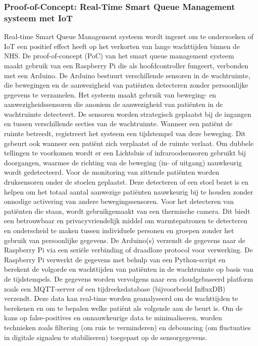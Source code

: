 \subsubsection*{Proof-of-Concept: Real-Time Smart Queue Management systeem met IoT}
Real-time Smart Queue Management systeem wordt ingezet om te onderzoeken of IoT een positief effect heeft op het verkorten van lange wachttijden binnen de NHS. De proof-of-concept (PoC) van het smart queue management systeem maakt gebruik van een Raspberry Pi die als hoofdcontroller fungeert, verbonden met een Arduino. De Arduino bestuurt verschillende sensoren in de wachtruimte, die bewegingen en de aanwezigheid van patiënten detecteren zonder persoonlijke gegevens te verzamelen. Het systeem maakt gebruik van beweging- en aanwezigheidssensoren die anoniem de aanwezigheid van patiënten in de wachtruimte detecteert. De sensoren worden strategisch geplaatst bij de ingangen en tussen verschillende secties van de wachtruimte. Wanneer een patiënt de ruimte betreedt, registreert het systeem een tijdstempel van deze beweging. Dit gebeurt ook wanneer een patiënt zich verplaatst of de ruimte verlaat. Om dubbele tellingen te voorkomen wordt er een Lichtsluis of infraroodsensoren gebruikt bij doorgangen, waarmee de richting van de beweging (in- of uitgang) nauwkeurig wordt gedetecteerd. Voor de monitoring van zittende patiënten worden druksensoren onder de stoelen geplaatst. Deze detecteren of een stoel bezet is en helpen om het totaal aantal aanwezige patiënten nauwkeurig bij te houden zonder onnodige activering van andere bewegingssensoren. Voor het detecteren van patiënten die staan, wordt gebruikgemaakt van een thermische camera. Dit biedt een betrouwbaar en privacyvriendelijk middel om warmtepatronen te detecteren en onderscheid te maken tussen individuele personen en groepen zonder het gebruik van persoonlijke gegevens. De Arduino(s) verzendt de gegevens naar de Raspberry Pi via een seriële verbinding of draadloze protocol voor verwerking. De Raspberry Pi verwerkt de gegevens met behulp van een Python-script en berekent de volgorde en wachttijden van patiënten in de wachtruimte op basis van de tijdstempels. De gegevens worden vervolgens naar een cloudgebaseerd platform zoals een MQTT-server of een tijdreeksdatabase (bijvoorbeeld InfluxDB) verzendt. Deze data kan real-time worden geanalyseerd om de wachttijden te berekenen en om te bepalen welke patiënt als volgende aan de beurt is. Om de kans op false-positives en onnauwkeurige data te minimaliseren, worden technieken zoals filtering (om ruis te verminderen) en debouncing (om fluctuaties in digitale signalen te stabiliseren) toegepast op de sensorgegevens.


